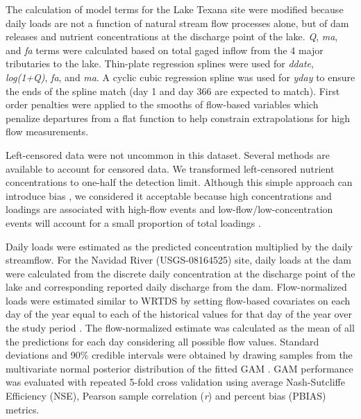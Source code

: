 \documentclass[fleqn,10pt,lineno]{wlpeerj} %
\begin{document}
The calculation of model terms for the Lake Texana site were modified
because daily loads are not a function of natural stream flow processes
alone, but of dam releases and nutrient concentrations at the discharge
point of the lake. \emph{Q}, \emph{ma}, and \emph{fa} terms were
calculated based on total gaged inflow from the 4 major tributaries to
the lake. Thin-plate regression splines were used for \emph{ddate},
\emph{log(1+Q)}, \emph{fa}, and \emph{ma}. A cyclic cubic regression
spline was used for \emph{yday} to ensure the ends of the spline match
(day 1 and day 366 are expected to match). First order penalties were
applied to the smooths of flow-based variables which penalize departures
from a flat function to help constrain extrapolations for high flow
measurements.

Left-censored data were not uncommon in this dataset. Several methods
are available to account for censored data. We transformed left-censored
nutrient concentrations to one-half the detection limit. Although this
simple approach can introduce bias
\autocite{hornungEstimationAverageConcentration1990}, we considered it
acceptable because high concentrations and loadings are associated with
high-flow events and low-flow/low-concentration events will account for
a small proportion of total loadings
\autocite{mcdowell_implications_2021}.

Daily loads were estimated as the predicted concentration multiplied by
the daily streamflow. For the Navidad River (USGS-08164525) site, daily
loads at the dam were calculated from the discrete daily concentration
at the discharge point of the lake and corresponding reported daily
discharge from the dam. Flow-normalized loads were estimated similar to
WRTDS by setting flow-based covariates on each day of the year equal to
each of the historical values for that day of the year over the study
period \autocite{hirschWeightedRegressionsTime2010}. The flow-normalized
estimate was calculated as the mean of all the predictions for each day
considering all possible flow values. Standard deviations and 90\%
credible intervals were obtained by drawing samples from the
multivariate normal posterior distribution of the fitted GAM
\autocite{woodConfidenceIntervalsGeneralized2006,marraCoveragePropertiesConfidence2012,mcdowell_implications_2021}.
GAM performance was evaluated with repeated 5-fold cross validation
\autocite{burmanComparativeStudyOrdinary1989} using average
Nash-Sutcliffe Efficiency (NSE), Pearson sample correlation (\emph{r})
and percent bias (PBIAS) metrics.
\end{document}
